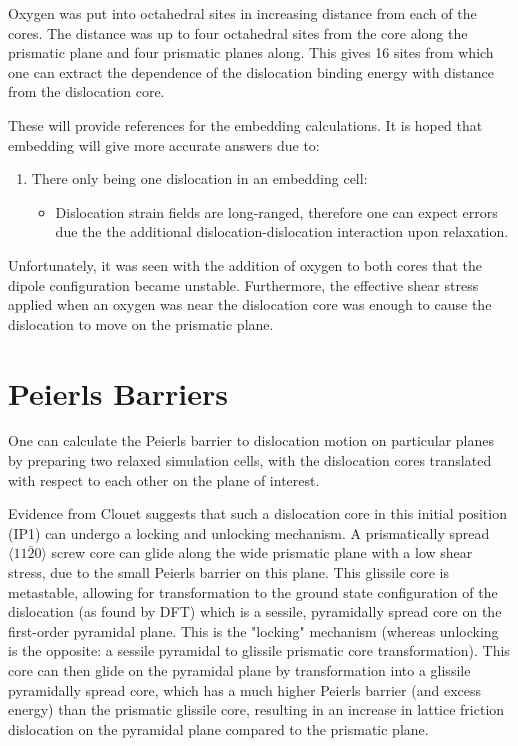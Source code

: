 \documentclass[11pt]{article}
\begin{document}
Oxygen was put into octahedral sites in increasing distance
from each of the cores. The distance was up to four octahedral sites
from the core along the prismatic plane and four prismatic planes
along. This gives 16 sites from which one can extract the
dependence of the dislocation binding energy with distance from the
dislocation core.

These will provide references for the embedding calculations. It is
hoped that embedding will give more accurate answers due to:
\begin{enumerate}
\item There only being one dislocation in an embedding cell:
\begin{itemize}
\item Dislocation strain fields are long-ranged, therefore one can
expect errors due the the additional dislocation-dislocation
interaction upon relaxation.
\end{itemize}
\end{enumerate}


Unfortunately, it was seen with the addition of oxygen to both
cores that the dipole configuration became unstable. Furthermore,
the effective shear stress applied when an oxygen was near the
dislocation core was enough to cause the dislocation to move on the
prismatic plane. 


\section{Peierls Barriers}
\label{sec:orge6b670c}

One can calculate the Peierls barrier to dislocation motion on
particular planes by preparing two relaxed simulation cells, with
the dislocation cores translated with respect to each other on the
plane of interest. 

Evidence from Clouet \cite{Clouet2015} suggests that such a
dislocation core in this initial position (IP1) can undergo a
locking and unlocking mechanism. A prismatically spread \(\langle
  11\bar{2}0 \rangle\) screw core can glide along the wide prismatic
plane with a low shear stress, due to the small Peierls barrier on
this plane. This glissile core is metastable, allowing for
transformation to the ground state configuration of the dislocation
(as found by DFT) which is a sessile, pyramidally spread core on the
first-order pyramidal plane. This is the "locking" mechanism
(whereas unlocking is the opposite: a sessile pyramidal to glissile
prismatic core transformation). This core can then glide on the
pyramidal plane by transformation into a glissile pyramidally spread
core, which has a much higher Peierls barrier (and excess energy)
than the prismatic glissile core, resulting in an increase in
lattice friction dislocation on the pyramidal plane compared to the
prismatic plane.
\end{document}
